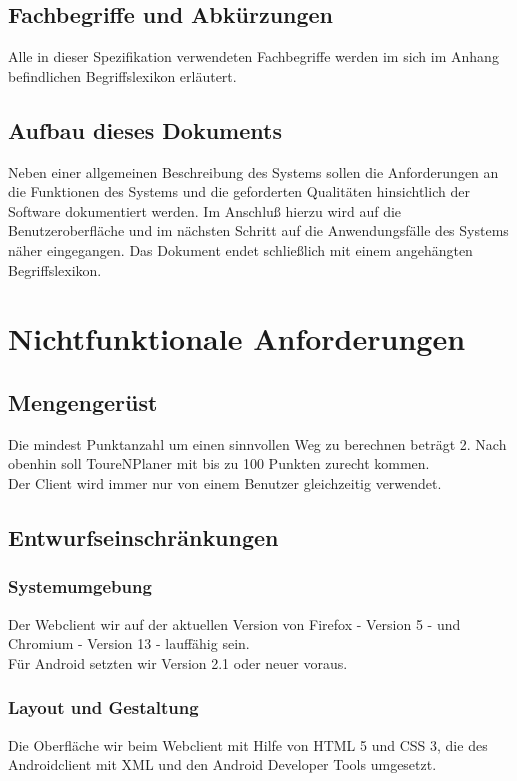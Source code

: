 \documentclass[a4paper,10pt,titlepage]{article}
\begin{document}
\subsection{Fachbegriffe und Abkürzungen}

Alle in dieser Spezifikation verwendeten Fachbegriffe werden im sich im Anhang befindlichen Begriffslexikon erläutert.

\subsection{Aufbau dieses Dokuments}

Neben einer allgemeinen Beschreibung des Systems sollen die Anforderungen an die Funktionen des Systems und die geforderten Qualitäten hinsichtlich der Software dokumentiert werden. 
Im Anschluß hierzu wird auf die Benutzeroberfläche und im nächsten Schritt auf die Anwendungsfälle des Systems näher eingegangen. 
Das Dokument endet schließlich mit einem angehängten Begriffslexikon.

\section{Nichtfunktionale Anforderungen}
\subsection{Mengengerüst}
\label{Mengengeruest}
Die mindest Punktanzahl um einen sinnvollen Weg zu berechnen beträgt 2.
Nach obenhin soll ToureNPlaner mit bis zu 100 Punkten zurecht kommen.\\
Der Client wird immer nur von einem Benutzer gleichzeitig verwendet.

\subsection{Entwurfseinschränkungen}
\subsubsection{Systemumgebung}
Der Webclient wir auf der aktuellen Version von Firefox - Version 5 - und Chromium - Version 13 - lauffähig sein.\\
Für Android setzten wir Version 2.1 oder neuer voraus.

\subsubsection{Layout und Gestaltung}
Die Oberfläche wir beim Webclient mit Hilfe von HTML 5 und CSS 3, die des Androidclient mit XML und den Android Developer Tools umgesetzt.
\end{document}
